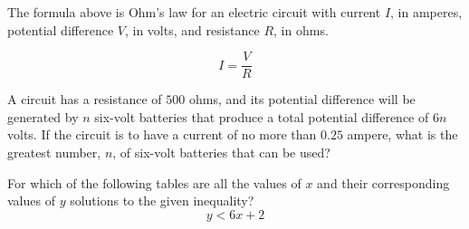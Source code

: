 \vspace{0.75em}


\newpage
\noindent\markforreview

\vspace{1em}

The formula above is Ohm’s law for an electric circuit with current $I$, in amperes, potential difference $V$, in volts, and resistance $R$, in ohms.

\[
I = \frac{V}{R}
\]

A circuit has a resistance of $500$ ohms, and its potential difference will be generated by $n$ six-volt batteries that produce a total potential difference of $6n$ volts. If the circuit is to have a current of no more than $0.25$ ampere, what is the greatest number, $n$, of six-volt batteries that can be used?
\newpage

\noindent\markforreview

\vspace{1em}

For which of the following tables are all the values of \( x \) and their corresponding values of \( y \) solutions to the given inequality?
\[
y < 6x + 2
\]

\vspace{0.75em}




